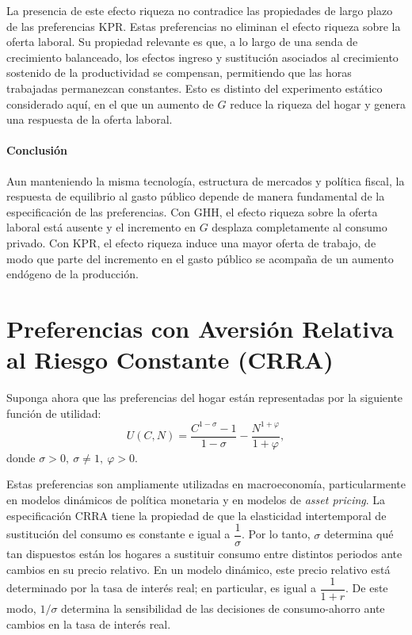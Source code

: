 \documentclass[11pt]{article}
\begin{document}
La presencia de este efecto riqueza no contradice las propiedades de largo plazo de las preferencias KPR. Estas preferencias no eliminan el efecto riqueza sobre la oferta laboral. Su propiedad relevante es que, a lo largo de una senda de crecimiento balanceado, los efectos ingreso y sustitución asociados al crecimiento sostenido de la productividad se compensan, permitiendo que las horas trabajadas permanezcan constantes. Esto es distinto del experimento estático considerado aquí, en el que un aumento de $G$ reduce la riqueza del hogar y genera una respuesta de la oferta laboral.

\paragraph{Conclusión}
Aun manteniendo la misma tecnología, estructura de mercados y política fiscal, la respuesta de equilibrio al gasto público depende de manera fundamental de la especificación de las preferencias. Con GHH, el efecto riqueza sobre la oferta laboral está ausente y el incremento en $G$ desplaza completamente al consumo privado. Con KPR, el efecto riqueza induce una mayor oferta de trabajo, de modo que parte del incremento en el gasto público se acompaña de un aumento endógeno de la producción.


\section{Preferencias con Aversión Relativa al Riesgo Constante (CRRA)}

Suponga ahora que las preferencias del hogar están representadas por la siguiente función de utilidad:
\[
U(C,N)
=
\frac{C^{1-\sigma}-1}{1-\sigma}
-
\frac{N^{1+\varphi}}{1+\varphi},
\]
donde $\sigma>0, \ \sigma\neq 1, \ \varphi>0$.

Estas preferencias son ampliamente utilizadas en macroeconomía, particularmente en modelos dinámicos de política monetaria y en modelos de \textit{asset pricing}.
La especificación CRRA tiene la propiedad de que la elasticidad intertemporal de sustitución del consumo es constante e igual a $\dfrac{1}{\sigma}$. Por lo tanto, $\sigma$ determina qué tan dispuestos están los hogares a sustituir consumo entre distintos periodos ante cambios en su precio relativo. En un modelo dinámico, este precio relativo está determinado por la tasa de interés real; en particular, es igual a $\dfrac{1}{1+r}$. De este modo, $1/\sigma$ determina la sensibilidad de las decisiones de consumo-ahorro ante cambios en la tasa de interés real.
\end{document}
